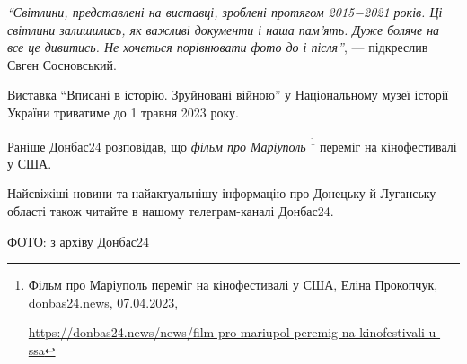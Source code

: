 \begin{leftbar}
\emph{\enquote{Світлини, представлені на виставці, зроблені протягом 2015−2021 років. Ці
світлини залишились, як важливі документи і наша пам'ять. Дуже боляче на все це
дивитись. Не хочеться порівнювати фото до і після}}, — підкреслив Євген
Сосновський.
\end{leftbar}



Виставка \enquote{Вписані в історію. Зруйновані війною} у Національному музеї історії
України триватиме до 1 травня 2023 року.

Раніше Донбас24 розповідав, що \href{https://donbas24.news/news/film-pro-mariupol-peremig-na-kinofestivali-u-ssa}{\emph{фільм про Маріуполь}}%
\footnote{Фільм про Маріуполь переміг на кінофестивалі у США, Еліна Прокопчук, donbas24.news, 07.04.2023, \par\url{https://donbas24.news/news/film-pro-mariupol-peremig-na-kinofestivali-u-ssa}} переміг на кінофестивалі у США.

Найсвіжіші новини та найактуальнішу інформацію про Донецьку й Луганську області
також читайте в нашому телеграм-каналі Донбас24.

ФОТО: з архіву Донбас24

